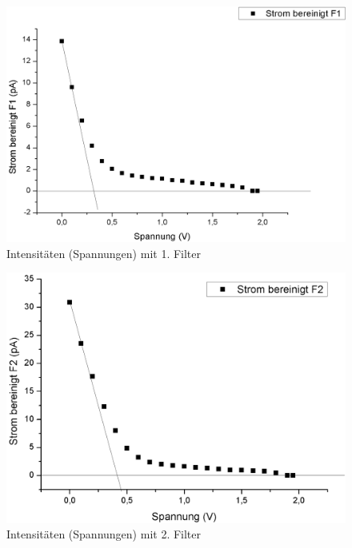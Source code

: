 \documentclass[12pt,a4paper]{article}
\begin{document}
\begin{figure}[H]
	\centering
	\includegraphics[scale=0.5]{./data/Filter1.png}
	\caption{Intensitäten (Spannungen) mit 1. Filter}
	\label{fig:filter1}
\end{figure}

\begin{figure}[H]
	\centering
	\includegraphics[scale=0.5]{./data/Filter2.png}
	\caption{Intensitäten (Spannungen) mit 2. Filter}
	\label{fig:filter2}
\end{figure}
\end{document}
